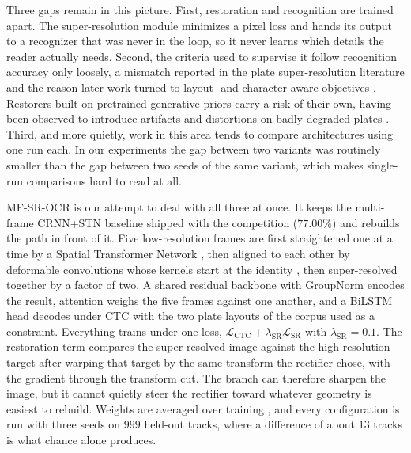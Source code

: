 \documentclass[runningheads]{llncs}
\begin{document}
Three gaps remain in this picture. First, restoration and recognition are trained apart. The super-resolution module minimizes a pixel loss and hands its output to a recognizer that was never in the loop, so it never learns which details the reader actually needs. Second, the criteria used to supervise it follow recognition accuracy only loosely, a mismatch reported in the plate super-resolution literature \cite{nascimento2025toward} and the reason later work turned to layout- and character-aware objectives \cite{nascimento2024lcdnet,sendjasni2025embedding}. Restorers built on pretrained generative priors carry a risk of their own, having been observed to introduce artifacts and distortions on badly degraded plates \cite{na2025mflpr2}. Third, and more quietly, work in this area tends to compare architectures using one run each. In our experiments the gap between two variants was routinely smaller than the gap between two seeds of the same variant, which makes single-run comparisons hard to read at all.

MF-SR-OCR is our attempt to deal with all three at once. It keeps the multi-frame CRNN+STN baseline shipped with the competition ($77.00\%$) and rebuilds the path in front of it. Five low-resolution frames are first straightened one at a time by a Spatial Transformer Network \cite{jaderberg2015stn}, then aligned to each other by deformable convolutions whose kernels start at the identity \cite{zhu2019dcnv2}, then super-resolved together by a factor of two. A shared residual backbone with GroupNorm \cite{wu2018groupnorm} encodes the result, attention weighs the five frames against one another, and a BiLSTM head decodes under CTC \cite{graves2006ctc} with the two plate layouts of the corpus used as a constraint. Everything trains under one loss, $\mathcal{L}_{\mathrm{CTC}} + \lambda_{\mathrm{SR}}\mathcal{L}_{\mathrm{SR}}$ with $\lambda_{\mathrm{SR}}=0.1$. The restoration term compares the super-resolved image against the high-resolution target after warping that target by the same transform the rectifier chose, with the gradient through the transform cut. The branch can therefore sharpen the image, but it cannot quietly steer the rectifier toward whatever geometry is easiest to rebuild. Weights are averaged over training \cite{tarvainen2017mean}, and every configuration is run with three seeds on $999$ held-out tracks, where a difference of about $13$ tracks is what chance alone produces.
\end{document}
